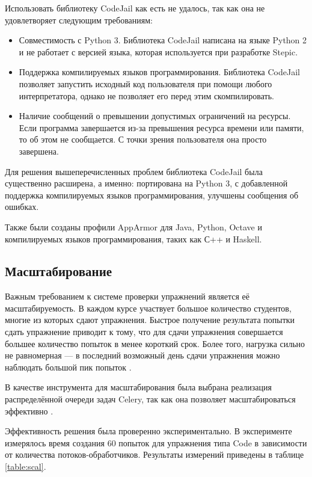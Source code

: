 \documentclass{matmex-diploma-custom}
\begin{document}
Использовать библиотеку CodeJail как есть не удалось, так как она не
удовлетворяет следующим требованиям:

\begin{itemize}
\item Совместимость с Python 3. Библиотека CodeJail написана на языке
  Python 2 и не работает с версией языка, которая используется при
  разработке Stepic.
\item Поддержка компилируемых языков программирования. Библиотека
  CodeJail позволяет запустить исходный код пользователя при помощи
  любого интерпретатора, однако не позволяет его перед этим
  скомпилировать.
\item Наличие сообщений о превышении допустимых ограничений на
  ресурсы. Если программа завершается из-за превышения ресурса времени
  или памяти, то об этом не сообщается. С точки зрения пользователя
  она просто завершена.
\end{itemize}

Для решения вышеперечисленных проблем библиотека CodeJail была
существенно расширена, а именно: портирована на Python 3, с
добавленной поддержка компилируемых языков программирования, улучшены
сообщения об ошибках.

Также были созданы профили AppArmor для Java, Python, Octave и
компилируемых языков программирования, таких как С++ и Haskell.

\subsection{Масштабирование}
Важным требованием к системе проверки упражнений является её
масштабируемость. В каждом курсе участвует большое количество
студентов, многие из которых сдают упражнения. Быстрое получение
результата попытки сдать упражнение приводит к тому, что для сдачи
упражнения совершается большее количество попыток в менее короткий
срок. Более того, нагрузка сильно не равномерная --- в последний
возможный день сдачи упражнения можно наблюдать большой пик попыток
\cite{breslow2013studying}.

В качестве инструмента для масштабирования была выбрана реализация
распределённой очереди задач Celery, так как она позволяет
масштабироваться эффективно \cite{celery}.

Эффективность решения была проверенно экспериментально. В эксперименте
измерялось время создания 60 попыток для упражнения типа Code в
зависимости от количества потоков-обработчиков. Результаты измерений
приведены в таблице \ref{table:scal}.
\end{document}
